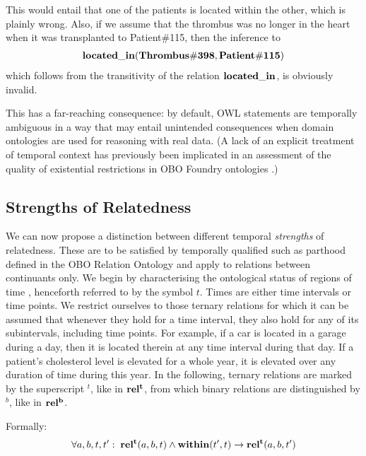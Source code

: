 This would entail that one of the patients is located within the other, which is plainly wrong. 
Also, if we assume that the thrombus was no longer in the heart when it was transplanted to Patient\#115, then the inference to
%
\begin{equation}
\begin{split}
\mathrm{\mathbf{located\_in}} (\mathrm{\mathbf{Thrombus\#398}}, \mathrm{\mathbf{Patient\#115}})
\end{split}
\label{eq:transEntailment}
\end{equation}
%
which follows from the transitivity of the relation $\mathrm{\mathbf{located\_in}}$, is obviously invalid.

This has a far-reaching consequence: by default, OWL statements are temporally ambiguous in a way that may entail unintended consequences when domain ontologies are used for reasoning with real data. (A lack of an explicit treatment of temporal context has previously been implicated in an assessment of the quality of existential restrictions in OBO Foundry ontologies \cite{boeker2011}.)

\subsection*{Strengths of Relatedness}

We can now propose a distinction between different temporal \emph{strengths} of relatedness. These are to be satisfied by temporally qualified such as parthood defined in the OBO Relation Ontology  and apply to relations between continuants only. 
We begin by characterising the ontological status of regions of time , henceforth referred to by the symbol $t$. 
Times are either time intervals or time points. %
We restrict ourselves to those ternary relations for which it can be assumed that whenever they hold for a time interval, 
they also hold for any of its subintervals, including time points. For example, if a car is located in a garage during a day, then it is located therein at any time interval during that day. If a patient's cholesterol level is elevated for a whole year, it is elevated over any duration of time during this year. 
In the following, ternary relations are marked by the superscript $^t$, like in $\mathrm{\mathbf{rel^t}}$, from which binary relations are  distinguished by
$^b$, like in $\mathrm{\mathbf{rel^b}}$.  

Formally:
\begin{equation}
\begin{split}
\forall a, b, t, t^\prime:\; \mathrm{\mathbf{rel^t}}(a, b, t) \wedge \mathrm{\mathbf{within}}(t^\prime,t) \rightarrow
\mathrm{\mathbf{rel^t}}(a,b,t^\prime)
\end{split}
\label{eq:temporarily:temp}
\end{equation}


